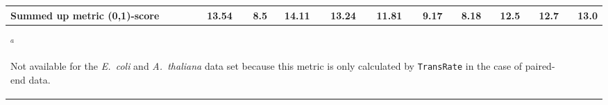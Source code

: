 \documentclass{scrartcl}
\begin{document}
\begin{landscape}
\begin{table}
\begin{scriptsize}
\begin{tabular}{llllllllllll}
\multicolumn{2}{l}{\textbf{Summed up metric (0,1)-score}}&13.54&8.5&14.11&13.24&11.81&9.17&8.18&12.5&12.7&13.0\\\bottomrule
\multicolumn{11}{l}{$^{a}$\begin{scriptsize}Not available for the \emph{E.~coli} and \emph{A.~thaliana} data set because this metric is only calculated by \texttt{TransRate} in the case of paired-end data.\end{scriptsize}}\\\end{tabular}\end{scriptsize}
\end{table}
\end{landscape}
\end{document}
